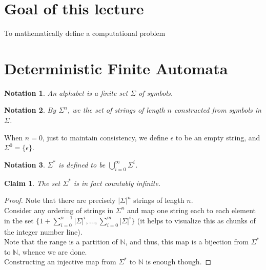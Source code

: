 \documentclass[a4paper]{article}
\newtheorem{claim}{Claim}
\newtheorem{notn}{Notation}
\begin{document}
\fi


\section{Goal of this lecture}

To mathematically define a computational problem

\section{Deterministic Finite Automata}

\begin{notn}
    An alphabet is a finite set $\Sigma$ of symbols.
\end{notn}

\begin{notn}
By $\Sigma^n$, we the set of strings of length $n$ constructed from symbols in $\Sigma$.
\end{notn}

When $n = 0$, just to maintain consistency, we define $\epsilon$ to be an empty string, and $\Sigma^0 = \{\epsilon\}$.\\

\begin{notn}
$\Sigma^*$ is defined to be $\bigcup_{i = 0}^\infty \Sigma^i$.
\end{notn}

\begin{claim}
    The set $\Sigma^*$ is in fact countably infinite.
\end{claim}

\begin{proof}
    Note that there are precisely $|\Sigma|^n$ strings of length $n$.\\

    Consider any ordering of strings in $\Sigma^n$ and map one string each to each element in the set $\{1 + \sum_{i = 0}^{n - 1}|\Sigma|^i, \ldots, \sum_{i = 0}^m |\Sigma|^i\}$ (it helps to
    visualize this as chunks of the integer number line).\\

    Note that the range is a partition of $\mathbb{N}$, and thus, this map is a bijection from $\Sigma^*$ to $\mathbb{N}$, whence we are done.\\

    Constructing an injective map from $\Sigma^*$ to $\mathbb{N}$ is enough though.
\end{proof}
\end{document}
